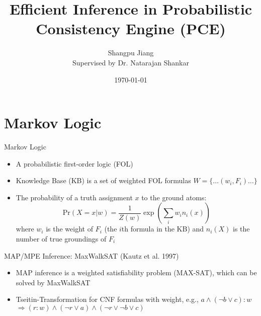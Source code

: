 \documentclass{beamer}
\title{Efficient Inference in Probabilistic Consistency Engine (PCE)}
\author{Shangpu Jiang\\ Supervised by Dr. Natarajan Shankar}
\date{\today}
\newcommand{\Prob}{\mbox{Pr}}
\begin{document}
\frame{\titlepage}

\section[Outline]{}
\frame{\tableofcontents}

\section{Markov Logic}

\begin{frame}{Markov Logic}

  \begin{itemize}
    \item A probabilistic first-order logic (FOL)
    \item Knowledge Base (KB) is a set of weighted FOL formulas $W = \{\ldots(w_{i},F_{i})\ldots\}$
    \item The probability of a truth assignment $x$ to the ground atoms:
    \[
      \Prob(X=x|w) = \frac{1}{Z(w)} \exp(\sum_i w_i n_i(x))
    \]
    where $w_i$ is the weight of $F_{i}$ (the $i$th formula in the KB) and
    $n_i(X)$ is the number of true groundings of $F_{i}$ 
  \end{itemize}

\end{frame}

\begin{frame}{MAP/MPE Inference: MaxWalkSAT (Kautz et al. 1997)}

	\begin{itemize}

		\item MAP inference is a weighted satisfiability problem (MAX-SAT),
			which can be solved by MaxWalkSAT

		\item Tseitin-Transformation for CNF formulas with weight, e.g.,
			$a \wedge (\neg b \vee c): w$ \\
			$\Rightarrow (r: w) \wedge (\neg r \vee a) \wedge (\neg r \vee \neg b \vee c)$

	\end{itemize}

\end{frame}
\end{document}
